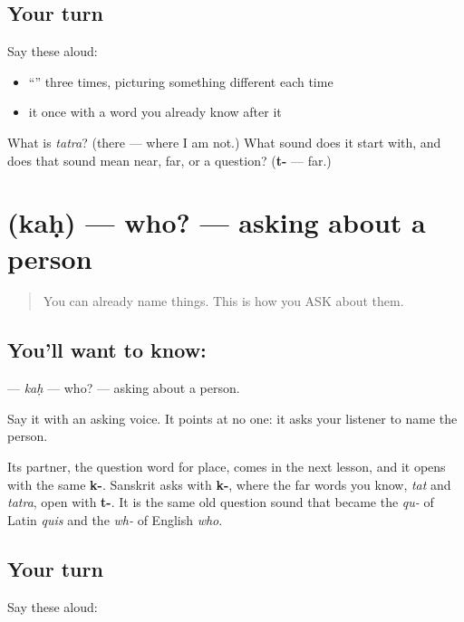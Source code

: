 \subsection*{Your turn}
Say these aloud:

\begin{itemize}
\raggedright
  \item \textquotedblleft{}\textquotedblright{} three times, picturing something different each time
  \item it once with a word you already know after it
\end{itemize}

\begin{tcolorbox}[breakable,colback=teal!4,colframe=teal!35!black,title={Before you move on}]
What is \emph{tatra}? (there — where I am not.) What sound does it start with, and does that sound mean near, far, or a question? (\textbf{t-} — far.)
\end{tcolorbox}
\section[\texorpdfstring{\sk{कः} (kaḥ)}{कः (kaḥ)}]{ (kaḥ) — who? — asking about a person}

\label{lesson:SA-C14-who}



\begin{quote}
You can already name things. This is how you ASK about them.
\end{quote}

\subsection*{You'll want to know: }
\textbf{} — \emph{kaḥ} — who? — asking about a person.

Say it with an asking voice. It points at no one: it asks your listener to name the person.

Its partner, the question word for place, comes in the next lesson, and it opens with the same \textbf{k-}. Sanskrit asks with \textbf{k-}, where the far words you know, \textbf{} \emph{tat} and \textbf{} \emph{tatra}, open with \textbf{t-}. It is the same old question sound that became the \emph{qu-} of Latin \emph{quis} and the \emph{wh-} of English \emph{who}.

\subsection*{Your turn}
Say these aloud:

